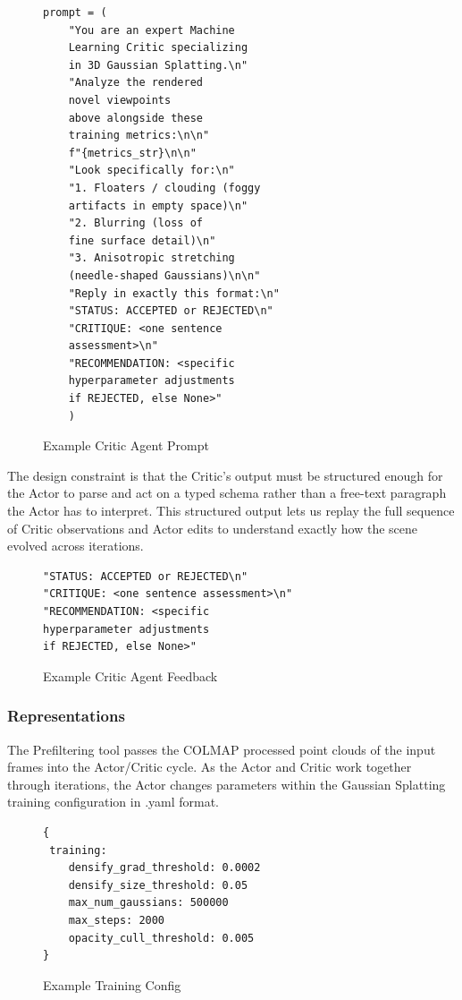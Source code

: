 \noindent{}
\begin{figure}[h]
\centering
\begin{verbatim}
prompt = (
    "You are an expert Machine 
    Learning Critic specializing 
    in 3D Gaussian Splatting.\n"
    "Analyze the rendered 
    novel viewpoints 
    above alongside these 
    training metrics:\n\n"
    f"{metrics_str}\n\n"
    "Look specifically for:\n"
    "1. Floaters / clouding (foggy 
    artifacts in empty space)\n"
    "2. Blurring (loss of 
    fine surface detail)\n"
    "3. Anisotropic stretching 
    (needle-shaped Gaussians)\n\n"
    "Reply in exactly this format:\n"
    "STATUS: ACCEPTED or REJECTED\n"
    "CRITIQUE: <one sentence 
    assessment>\n"
    "RECOMMENDATION: <specific 
    hyperparameter adjustments 
    if REJECTED, else None>"
    )
\end{verbatim}
\caption{Example Critic Agent Prompt}
\label{fig:critic-agent-prompt}
\end{figure}


\noindent The design constraint is that the Critic's output must be structured enough for the Actor to parse and act on a typed schema rather than a free-text paragraph the Actor has to interpret. This structured output lets us replay the full sequence of Critic observations and Actor edits to understand exactly how the scene evolved across iterations.

\noindent{}
\begin{figure}[h]
\centering
\begin{verbatim}
"STATUS: ACCEPTED or REJECTED\n"
"CRITIQUE: <one sentence assessment>\n"
"RECOMMENDATION: <specific 
hyperparameter adjustments 
if REJECTED, else None>"
\end{verbatim}
\caption{Example Critic Agent Feedback}
\label{fig:ex-critic-agent-feedback}
\end{figure}

\subsubsection{Representations}
The Prefiltering tool passes the COLMAP processed point clouds of the input frames into the Actor/Critic cycle. As the Actor and Critic work together through iterations, the Actor changes parameters within the Gaussian Splatting training configuration in .yaml format.

\noindent{}
\begin{figure}[h]
\centering
\begin{verbatim}
{
 training:
    densify_grad_threshold: 0.0002
    densify_size_threshold: 0.05
    max_num_gaussians: 500000
    max_steps: 2000
    opacity_cull_threshold: 0.005
}
\end{verbatim}
\caption{Example Training Config}
\label{fig:json-schema}
\end{figure}

